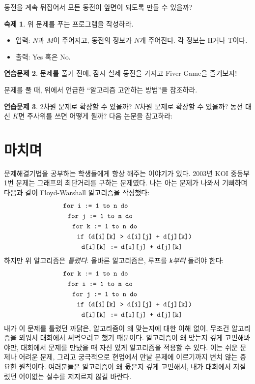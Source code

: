 \documentclass{oblivoir}
\theoremstyle{definition}
\newtheorem{exercise}{연습문제}
\newtheorem{homework}[exercise]{숙제}
\begin{document}
동전을 계속 뒤집어서 모든 동전이 앞면이 되도록 만들 수 있을까?

\begin{homework}
  위 문제를 푸는 프로그램을 작성하라.
  \begin{itemize}
  \item 입력: $N$과 $M$이 주어지고, 동전의 정보가 $N$개 주어진다. 각
    정보는 H거나 T이다.
  \item 출력: Yes 혹은 No.
  \end{itemize}
\end{homework}

\begin{exercise}
  문제를 풀기 전에, 잠시 실제 동전을 가지고 Fiver Game을 즐겨보자!
\end{exercise}

문제를 풀 때, 위에서 언급한 ``알고리즘 고안하는 방법''을 참조하라.

\begin{exercise}
  2차원 문제로 확장할 수 있을까? $N$차원 문제로 확장할 수 있을까?  동전
  대신 $K$면 주사위를 쓰면 어떻게 될까?  다음 논문을 참고하라:
  \cite{DBLP:journals/combinatorics/KangKP12}
\end{exercise}

\section{마치며}
문제해결기법을 공부하는 학생들에게 항상 해주는 이야기가 있다.  2003년
KOI 중등부 1번 문제는 그래프의 최단거리를 구하는 문제였다.  나는 아는
문제가 나와서 기뻐하며 다음과 같이 Floyd-Warshall 알고리즘을 작성했다:
\begin{align*}
& \texttt{for \texttt{i} := 1 to n do} \\
& \ \ \texttt{for \texttt{j} := 1 to n do} \\
& \ \ \ \ \texttt{for \texttt{k} := 1 to n do} \\
& \ \ \ \ \ \ \texttt{if (d[i][k] > d[i][j] + d[j][k])} \\
& \ \ \ \ \ \ \ \ \texttt{d[i][k] := d[i][j] + d[j][k]}
\end{align*}
하지만 위 알고리즘은 \emph{틀렸다}.  올바른 알고리즘은, 루프를
\emph{\texttt{k}부터} 돌려야 한다:
\begin{align*}
& \texttt{for \texttt{k} := 1 to n do} \\
& \ \ \texttt{for \texttt{i} := 1 to n do} \\
& \ \ \ \ \texttt{for \texttt{j} := 1 to n do} \\
& \ \ \ \ \ \ \texttt{if (d[i][k] > d[i][j] + d[j][k])} \\
& \ \ \ \ \ \ \ \ \texttt{d[i][k] := d[i][j] + d[j][k]}
\end{align*}
내가 이 문제를 틀렸던 까닭은, 알고리즘이 왜 맞는지에 대한 이해 없이,
무조건 알고리즘을 외워서 대회에서 써먹으려고 했기 때문이다.  알고리즘이
왜 맞는지 깊게 고민해봐야만, 대회에서 문제를 만났을 때 자신 있게
알고리즘을 적용할 수 있다.  이는 쉬운 문제나 어려운 문제, 그리고
궁극적으로 현업에서 만날 문제에 이르기까지 변치 않는 중요한 원칙이다.
여러분들은 알고리즘이 왜 옳은지 깊게 고민해서, 내가 대회에서 저질렀던
어이없는 실수를 저지르지 않길 바란다.
\end{document}
